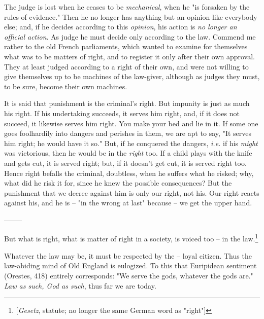 The judge is lost when he ceases to be \textit{mechanical}, when he "{}is 
forsaken by the rules of evidence."{} Then he no longer has anything but an 
opinion like everybody else; and, if he decides according to this 
\textit{opinion}, his action is \textit{no longer an official action}. As 
judge he must decide only according to the law. Commend me rather to the old 
French parliaments, which wanted to examine for themselves what was to be 
matters of right, and to register it only after their own approval. They at 
least judged according to a right of their own, and were not willing to give 
themselves up to be machines of the law-giver, although as judges they must, 
to be sure, become their own machines.

It is said that punishment is the criminal's right. But impunity is just as 
much his right. If his undertaking succeeds, it serves him right, and, if it 
does not succeed, it likewise serves him right. You make your bed and lie in 
it. If some one goes foolhardily into dangers and perishes in them, we are apt 
to say, "{}It serves him right; he would have it so."{} But, if he conquered 
the dangers, \textit{i.e.} if his \textit{might} was victorious, then he would 
be in the \textit{right} too. If a child plays with the knife and gets cut, it 
is served right; but, if it doesn't get cut, it is served right too. Hence 
right befalls the criminal, doubtless, when he suffers what he risked; why, 
what did he risk it for, since he knew the possible consequences? But the 
punishment that we decree against him is only our right, not his. Our right 
reacts against his, and he is -- "{}in the wrong at last"{} because -- we get 
the upper hand.

\begin{center}
--------\end{center}


But what is right, what is matter of right in a society, is voiced too -- in 
the law.\footnote{[\textit{Gesetz}, statute; no longer the same German word as 
"{}right"{}]}

Whatever the law may be, it must be respected by the -- loyal citizen. Thus 
the law-abiding mind of Old England is eulogized. To this that Euripidean 
sentiment (Orestes, 418) entirely corresponds: "{}We serve the gods, whatever 
the gods are."{} \textit{Law as such, God as such}, thus far we are today.

